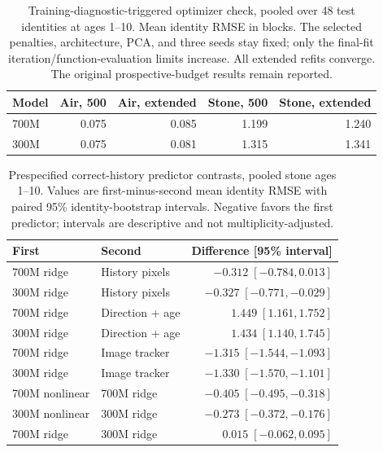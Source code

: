\begin{table}[!htbp]\centering\small
\caption{Training-diagnostic-triggered optimizer check, pooled over 48 test identities at ages 1--10. Mean identity RMSE in blocks. The selected penalties, architecture, PCA, and three seeds stay fixed; only the final-fit iteration/function-evaluation limits increase. All extended refits converge. The original prospective-budget results remain reported.}
\begin{tabular}{@{}lrrrr@{}}\toprule Model & Air, 500 & Air, extended & Stone, 500 & Stone, extended\\\midrule
700M & 0.075 & 0.085 & 1.199 & 1.240\\
300M & 0.075 & 0.081 & 1.315 & 1.341\\
\bottomrule\end{tabular}\end{table}
\begin{table}[!htbp]\centering\small
\caption{Prespecified correct-history predictor contrasts, pooled stone ages 1--10. Values are first-minus-second mean identity RMSE with paired 95\% identity-bootstrap intervals. Negative favors the first predictor; intervals are descriptive and not multiplicity-adjusted.}
\begin{tabular}{@{}llr@{}}\toprule First & Second & Difference [95\% interval]\\\midrule
700M ridge & History pixels & $-0.312\;[-0.784,0.013]$\\
300M ridge & History pixels & $-0.327\;[-0.771,-0.029]$\\
700M ridge & Direction + age & $1.449\;[1.161,1.752]$\\
300M ridge & Direction + age & $1.434\;[1.140,1.745]$\\
700M ridge & Image tracker & $-1.315\;[-1.544,-1.093]$\\
300M ridge & Image tracker & $-1.330\;[-1.570,-1.101]$\\
700M nonlinear & 700M ridge & $-0.405\;[-0.495,-0.318]$\\
300M nonlinear & 300M ridge & $-0.273\;[-0.372,-0.176]$\\
700M ridge & 300M ridge & $0.015\;[-0.062,0.095]$\\
\bottomrule\end{tabular}\end{table}
